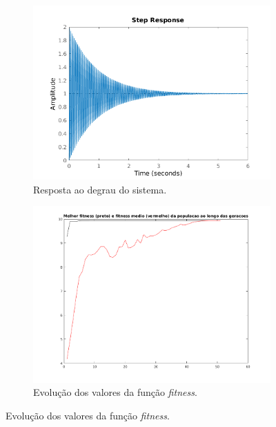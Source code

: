 \begin {enumerate}
\begin{figure}[h!]
		\begin{subfigure}{.5\textwidth}
		  \centering
		  \includegraphics[width=1\linewidth]{pid/step_pid_ex_c_mod}
		  \caption{Resposta ao degrau do sistema.}
		  \label{fig:pid_step_c_mod}
		\end{subfigure}%
		\begin{subfigure}{.5\textwidth}
		  \centering
		  \includegraphics[width=1\linewidth]{pid/melhor_fitness_pid_ex_c_mod}
		  \caption{Evolução dos valores da função \textit{fitness}.}
		  \label{fig:pid_fitness_c_mod}
		\end{subfigure}%
		

\end{figure}
\end{enumerate}
